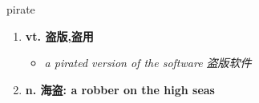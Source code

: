 
\begin{frame}
{\huge pirate}
\begin{center}
\begin{enumerate}\Large
  \item \textbf{vt. 盗版,盗用}
  \begin{itemize}
    \item \em{\Large{a pirated version of the software 盗版软件}}
  \end{itemize}
  \item \textbf{n. 海盗: a robber on the high seas}
\end{enumerate}
\end{center}
\end{frame}
